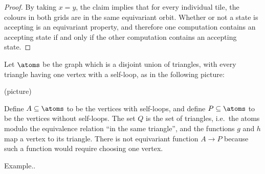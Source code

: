 \begin{proof}
By taking $x=y$, the claim implies that for every individual tile, the colours in both grids are in the same equivariant orbit. Whether or not a state is accepting is an equivariant property, and therefore one computation contains an accepting state if and only if the other computation contains an accepting state.
\end{proof}


\exercisepart


 {Let $\atoms$ be the graph which is a disjoint union of triangles, with every triangle having one vertex with a self-loop, as in the following picture:
\begin{center}
(picture)
\end{center}
Define $A \subseteq \atoms$ to be the vertices with self-loops, and define $P \subseteq \atoms$ to be the vertices without self-loops. The set $Q$ is the set of triangles, i.e.~the atoms modulo the equivalence relation ``in the same triangle'', and the functions $g$ and $h$ map a vertex to its triangle. There is not equivariant function $A \to P$ because such a function would require choosing one vertex. }



{Example..}
